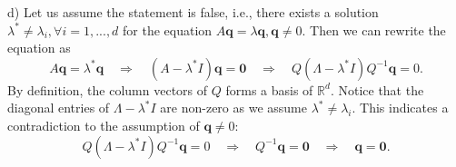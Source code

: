 d) Let us assume the statement is false, i.e., there exists a solution $\lambda^* \neq \lambda_i, \forall i = 1, ..., d$ for the equation $A \bm{q} = \lambda \bm{q}, \bm{q} \neq 0$. Then we can rewrite the equation as
$$A \bm{q} = \lambda^* \bm{q} \quad \Rightarrow \quad (A - \lambda^* I) \bm{q} = \bm{0} \quad \Rightarrow \quad Q (\Lambda - \lambda^* I) Q^{-1} \bm{q} = 0.$$
By definition, the column vectors of $Q$ forms a basis of $\mathbb{R}^d$. Notice that the diagonal entries of $\Lambda - \lambda^* I$ are non-zero as we assume $\lambda^* \neq \lambda_i$. This indicates a contradiction to the assumption of $\bm{q} \neq 0$:
$$Q (\Lambda - \lambda^* I) Q^{-1} \bm{q} = 0 \quad \Rightarrow \quad Q^{-1}\bm{q} = \bm{0} \quad \Rightarrow \quad \bm{q} = \bm{0}.$$

